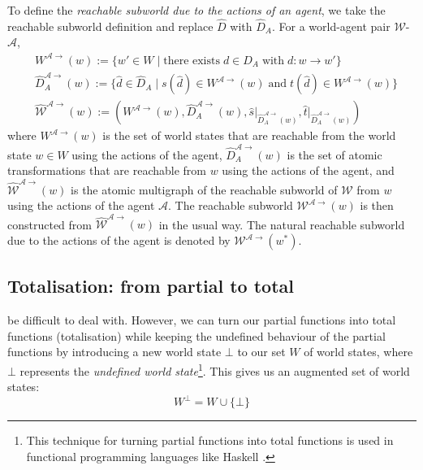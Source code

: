 To define the \emph{reachable subworld due to the actions of an agent}, we take the reachable subworld definition and replace $\hat{D}$ with $\hat{D}_{A}$.
For a world-agent pair $\mathscr{W}$-$\mathscr{A}$,
\begin{align}
	 & W^{\mathscr{A}\to}(w) := \{ w' \in W \mid \text{there exists} \; d \in D_{A} \; \text{with} \; d: w \to w' \} \\
	 & \hat{D}_{A}^{\mathscr{A}\to}(w) := \{ \hat{d} \in \hat{D}_{A} \mid s(\hat{d}) \in W^{\mathscr{A}\to}(w) \; \text{and} \; t(\hat{d}) \in W^{\mathscr{A}\to}(w) \} \\
	 & \hat{\mathscr{W}}^{\mathscr{A}\to}(w) := (W^{\mathscr{A}\to}(w), \hat{D}_{A}^{\mathscr{A}\to}(w), \hat{s} \big|_{\hat{D}_{A}^{\mathscr{A}\to}(w)}, \hat{t} \big|_{\hat{D}_{A}^{\mathscr{A}\to}(w)})
\end{align}
where $W^{\mathscr{A}\to}(w)$ is the set of world states that are reachable from the world state $w \in W$ using the actions of the agent, $\hat{D}_{A}^{\mathscr{A}\to}(w)$ is the set of atomic transformations that are reachable from $w$ using the actions of the agent, and $\hat{\mathscr{W}}^{\mathscr{A}\to}(w)$ is the atomic multigraph of the reachable subworld of $\mathscr{W}$ from $w$ using the actions of the agent $\mathscr{A}$.
The reachable subworld $\mathscr{W}^{\mathscr{A}\to}(w)$ is then constructed from $\hat{\mathscr{W}}^{\mathscr{A}\to}(w)$ in the usual way.
The natural reachable subworld due to the actions of the agent is denoted by $\mathscr{W}^{\mathscr{A}\to}(w^{*})$.


\subsection{Totalisation: from partial to total}

 be difficult to deal with.
However, we can turn our partial functions into total functions (totalisation) while keeping the undefined behaviour of the partial functions by introducing a new world state $\bot$ to our set $W$ of world states, where $\bot$ represents the \emph{undefined world state}\footnote{
    This technique for turning partial functions into total functions is used in functional programming languages like Haskell \autocite{marlow2010haskell}.
}.
This gives us an augmented set of world states:
\begin{equation}
	W^{\bot} = W \cup \{ \bot \}
\end{equation}

